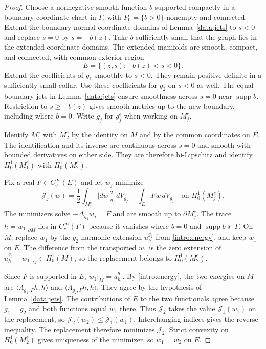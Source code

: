 \documentclass[11pt,a4paper]{article}
\theoremstyle{definition}
\theoremstyle{remark}
\DeclareMathOperator{\supp}{supp}
\numberwithin{equation}{section}
\begin{document}
\begin{proof}
Choose a nonnegative smooth function $b$ supported compactly in
a boundary coordinate chart in $\Gamma$, with $P_0=\{b>0\}$
nonempty and connected. Extend the boundary-normal coordinate domains
of Lemma~\ref{data:jets} to $s<0$ and replace $s=0$ by $s=-b(z)$.
Take $b$ sufficiently small that the graph lies in the extended
coordinate domains. The extended manifolds are smooth, compact,
and connected, with common exterior region
\[
 E=\{(z,s):-b(z)<s<0\}.
\]
Extend the coefficients of $g_1$ smoothly to $s<0$. They remain
positive definite in a sufficiently small collar. Use these
coefficients for $g_2$ on $s<0$ as well. The equal boundary jets in
Lemma~\ref{data:jets} ensure smoothness across $s=0$ near $\supp b$.
Restriction to $s\ge-b(z)$ gives smooth metrics up to the new
boundary, including where $b=0$. Write $g_j$ for $g_j^e$ when
working on $M_j^e$.

Identify $M_1^e$ with $M_2^e$ by the identity on $M$ and by the
common coordinates on $E$. The identification and its inverse are
continuous across $s=0$ and smooth with bounded derivatives on
either side. They are therefore bi-Lipschitz and identify
$H^1_0(M_1^e)$ with $H^1_0(M_2^e)$.

Fix a real $F\in C_c^\infty(E)$ and let $w_j$ minimize
\[
 \mathcal J_j(w)=\frac12\int_{M_j^e}|dw|_{g_j}^2\,dV_{g_j}
                       -\int_E Fw\,dV_{g_j}
       \quad\text{on }H^1_0(M_j^e).
\]
The minimizers solve $-\Delta_{g_j}w_j=F$ and are smooth up to
$\partial M_j^e$. The trace $h=w_1|_{\partial M}$ lies in
$C_c^\infty(\Gamma)$ because it vanishes where $b=0$ and
$\supp b\Subset\Gamma$. On $M$, replace $w_1$ by the $g_2$-harmonic extension
$u_h^{g_2}$ from \eqref{intro:energy}, and keep $w_1$ on $E$.
The difference from the transported $w_1$ is the zero extension of
$u_h^{g_2}-w_1|_M\in H^1_0(M)$, so the replacement belongs to
$H^1_0(M_2^e)$.

Since $F$ is supported in $E$, $w_1|_M=u_h^{g_1}$. By
\eqref{intro:energy}, the two energies on $M$ are
$\langle\Lambda_{g_1,\Gamma}h,h\rangle$ and
$\langle\Lambda_{g_2,\Gamma}h,h\rangle$. They agree by the
hypothesis of Lemma~\ref{data:jets}.
The contributions of $E$ to the two functionals agree because
$g_1=g_2$ and both functions equal $w_1$ there. Thus $\mathcal J_2$
takes the value $\mathcal J_1(w_1)$ on the replacement, so
$\mathcal J_2(w_2)\le\mathcal J_1(w_1)$. Interchanging indices gives the
reverse inequality. The replacement therefore minimizes $\mathcal J_2$.
Strict convexity on $H_0^1(M_2^e)$ gives uniqueness of the minimizer,
so $w_1=w_2$ on $E$.


\end{proof}
\end{document}
